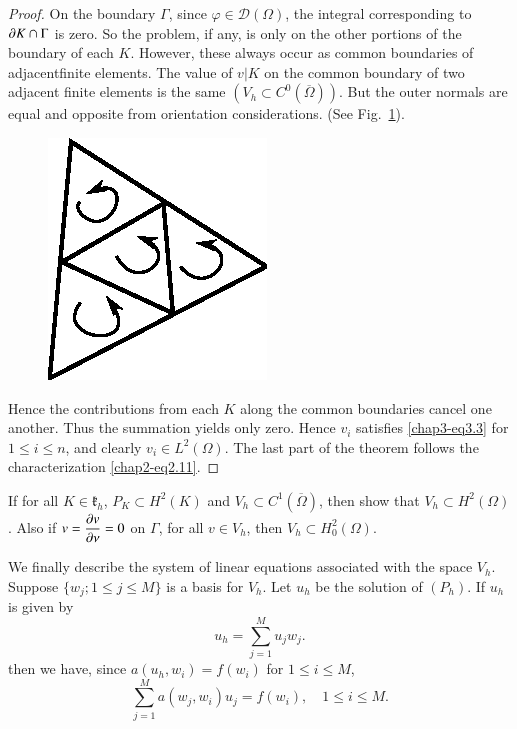 \begin{proof}
On the boundary $\Gamma$, since $\varphi\in\mathscr{D}(\Omega)$, the
integral corresponding to $\partial K\cap \Gamma$ is zero. So the problem,
if any, is only on the other portions of the boundary of each
$K$. However, these always occur as common boundaries of
adjacent\pageoriginale finite elements. The value of $v|K$ on the
common boundary of two adjacent finite elements is the same
$(V_{h}\subset C^{0}(\overline{\Omega}))$. But the outer normals are
equal and opposite from orientation considerations. (See
Fig.~\ref{chap3-fig3.2}). 
\begin{figure}[H]
\centering
\includegraphics{figure/fig3.2.eps}
\caption{}\label{chap3-fig3.2}
\end{figure}

Hence the contributions from each $K$ along the common boundaries
cancel one another. Thus the summation yields only zero. Hence $v_{i}$
satisfies \eqref{chap3-eq3.3} for $1\leq i\leq n$, and clearly
$v_{i}\in L^{2}(\Omega)$. The last part of the theorem follows the
characterization \eqref{chap2-eq2.11}.
\end{proof}

\begin{exercise}\label{chap3-exer3.1}
If for all $K\in \mathfrak{k}_{h}$, $P_{K}\subset H^{2}(K)$ and
$V_{h}\subset C^{1}(\overline{\Omega})$, then show that $V_{h}\subset
H^{2}(\Omega)$. Also if $v=\dfrac{\partial v}{\partial \nu}=0$ on $\Gamma$, for
all $v\in V_{h}$, then $V_{h}\subset H^{2}_{0}(\Omega)$. 
\end{exercise}

We finally describe the system of linear equations associated with the
space $V_{h}$. Suppose $\{w_{j};1\leq j\leq M\}$ is a basis for
$V_{h}$. Let $u_{h}$ be the solution of $(P_{h})$. If $u_{h}$ is given
by
\begin{equation*}
u_{h}=\sum^{M}_{j=1}u_{j}w_{j}.\tag{3.6}\label{chap3-eq3.6}
\end{equation*}
then we have, since $a(u_{h},w_{i})=f(w_{i})$ for $1\leq i\leq M$,
\begin{equation*}
\sum^{M}_{j=1}a(w_{j},w_{i})u_{j}=f(w_{i}),\quad 1\leq i\leq
M.\tag{3.7}\label{chap3-eq3.7} 
\end{equation*}

